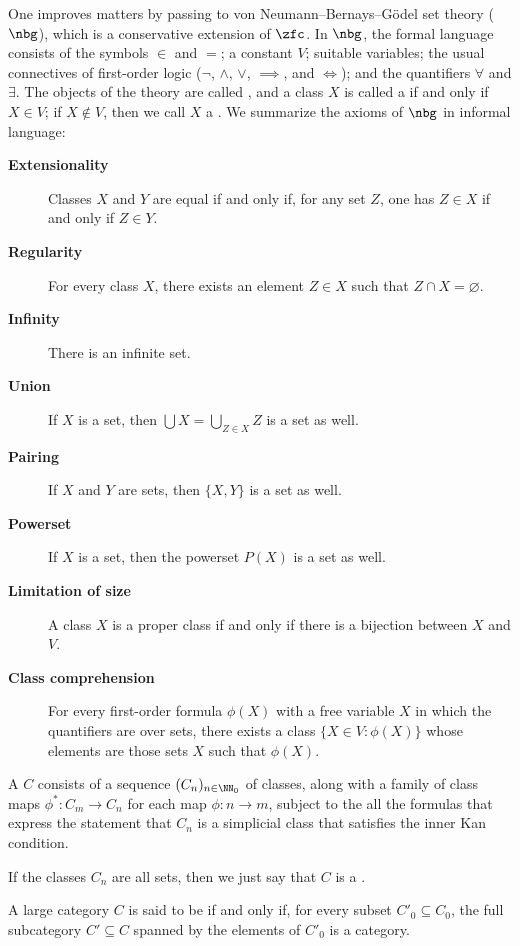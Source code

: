 One improves matters by passing to von Neumann--Bernays--Gödel set theory ($\nbg$),
which is a conservative extension of $\zfc$.
In $ \nbg $, the formal language consists of the symbols $\in$ and $=$;
a constant $V$; suitable variables;
the usual connectives of first-order logic ($\neg$, $\wedge$, $\vee$, $\implies$, and $\iff$);
and the quantifiers $\forall$ and $\exists$.
The objects of the theory are called , and a class $ X $ is called a  if and only if $X \in V$;
if $ X \notin V $, then we call $ X $ a .
We summarize the axioms of $ \nbg $ in informal language:
\begin{description}
	\item[\textbf{Extensionality}] Classes $ X $ and $ Y $ are equal if and only if, for any set $ Z $, one has $ Z \in X $ if and only if $ Z \in Y $.
	\item[\textbf{Regularity}] For every class $ X $, there exists an element $ Z \in X $ such that $ Z \cap X = \varnothing $.
	\item[\textbf{Infinity}] There is an infinite set.
	\item[\textbf{Union}] If $ X $ is a set, then $ \bigcup X = \bigcup_{Z \in X} Z $ is a set as well.
	\item[\textbf{Pairing}] If $X$ and $Y$ are sets, then $ \{X,Y\} $ is a set as well.
	\item[\textbf{Powerset}] If $ X $ is a set, then the powerset $ P(X) $ is a set as well.
	\item[\textbf{Limitation of size}] A class $X$ is a proper class if and only if there is a bijection between $X$ and $V$.
	\item[\textbf{Class comprehension}] For every first-order formula $ \phi(X) $ with a free variable $ X $ in which the quantifiers are over sets, there exists a class $ \{ X \in V : \phi(X) \} $ whose elements are those sets $ X $ such that $ \phi(X) $.
\end{description}

\begin{definition}
	A  $C$ consists of a sequence $(C_n)_{n\in\NN_0}$ of classes,
	along with a family of class maps $ \phi^{\ast} \colon C_m \to C_n $ for each map $ \phi \colon n \to m $,
	subject to the all the formulas that express the statement that $C_n$ is a simplicial class
	that satisfies the inner Kan condition.
	
	If the classes $ C_n $ are all sets, then we just say that $ C $ is a .
	
	A large category $ C $ is said to be  if and only if, for every subset $ C'_0 \subseteq C_0$, the full subcategory $ C' \subseteq C $ spanned by the elements of $ C'_0 $ is a category.
\end{definition}

